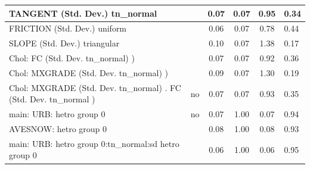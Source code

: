 \begin{table}
\begin{center}
\begin{tabular}{|l|l|c|c|c|l|}
			\hline
			TANGENT (Std. Dev.) tn_normal &  & 0.07 & 0.07 & 0.95 & 0.34 \\
			\hline
			FRICTION (Std. Dev.) uniform &  & 0.06 & 0.07 & 0.78 & 0.44 \\
			\hline
			SLOPE (Std. Dev.) triangular &  & 0.10 & 0.07 & 1.38 & 0.17 \\
			\hline
			 Chol: FC (Std. Dev. tn_normal) ) &  & 0.07 & 0.07 & 0.92 & 0.36 \\
			\hline
			 Chol: MXGRADE (Std. Dev. tn_normal) ) &  & 0.09 & 0.07 & 1.30 & 0.19 \\
			\hline
			 Chol: MXGRADE (Std. Dev. tn_normal) . FC (Std. Dev.   tn_normal ) & no & 0.07 & 0.07 & 0.93 & 0.35 \\
			\hline
			main: URB: hetro group 0 & no & 0.07 & 1.00 & 0.07 & 0.94 \\
			\hline
			AVESNOW: hetro group 0 &  & 0.08 & 1.00 & 0.08 & 0.93 \\
			\hline
			main: URB: hetro group 0:tn_normal:sd  hetro group 0 &  & 0.06 & 1.00 & 0.06 & 0.95 \\
			\hline
		\end{tabular}
	\end{center}
\end{table}